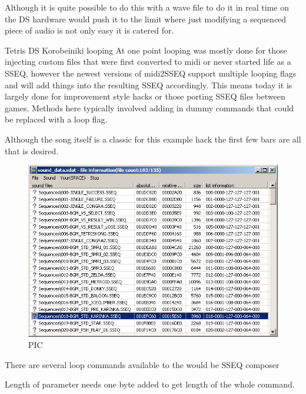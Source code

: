 \documentclass[
]{book}
\begin{document}
Although it is quite possible to do this with a wave file to do it in real time on the DS hardware would push it to the limit where just modifying a sequenced piece of audio is not only easy it is catered for.

Tetris DS Korobeiniki looping At one point looping was mostly done for those injecting custom files that were first converted to midi or never started life as a SSEQ, however the newest versions of midi2SSEQ support multiple looping flags and will add things into the resulting SSEQ accordingly. This means today it is largely done for improvement style hacks or those porting SSEQ files between games. Methods here typically involved adding in dummy commands that could be replaced with a loop flag.

Although the song itself is a classic for this example hack the first few bars are all that is desired.

\begin{figure}
\centering
\includegraphics{images/157_home_fast6191_romhackingguide_unrenamed_fil____original_borders_romhackguideSDATlooping_1.png}
\caption{PIC}
\end{figure}

There are several loop commands available to the would be SSEQ composer

Length of parameter needs one byte added to get length of the whole command.
\end{document}
